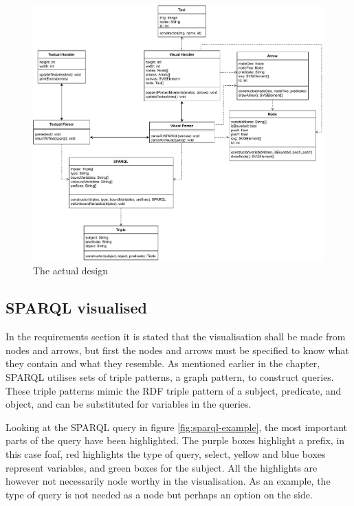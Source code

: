 \begin{figure}[H]
    \centering
    \includegraphics[angle=90,origin=c,width=1.3\textwidth]{figures/1st_iteration_design.pdf}
    \caption{The actual design}
    \label{fig:first-design}
\end{figure}

\subsection{SPARQL visualised}
In the requirements section it is stated that the visualisation shall be made from nodes and arrows, but first the nodes and arrows must be specified to know what they contain and what they resemble. As mentioned earlier in the chapter, SPARQL utilises sets of triple patterns, a graph pattern, to construct queries. These triple patterns mimic the RDF triple pattern of a subject, predicate, and object, and can be substituted for variables in the queries.

\bigskip
Looking at the SPARQL query in figure \ref{fig:sparql-example}, the most important parts of the query have been highlighted. The purple boxes highlight a prefix, in this case foaf, red highlights the type of query, select, yellow and blue boxes represent variables, and green boxes for the subject. All the highlights are however not necessarily node worthy in the visualisation. As an example, the type of query is not needed as a node but perhaps an option on the side.

